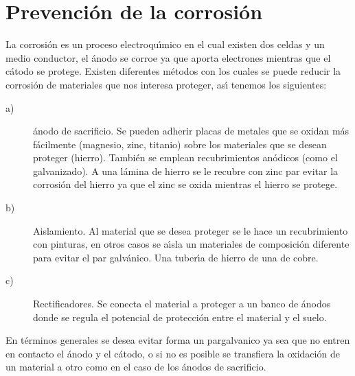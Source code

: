 \section{Prevenci\'on de la corrosi\'on}

La corrosi\'on  es un proceso
electroqu\'{\i}mico en el cual existen dos celdas y un medio conductor, el \'anodo se
corroe ya que aporta electrones mientras que el c\'atodo se protege.
Existen diferentes m\'etodos con los cuales se puede reducir la corrosi\'on de materiales
que nos interesa proteger, as\'{\i} tenemos los siguientes:

\begin{description}
\item[a)]\'anodo de sacrificio. Se pueden adherir placas de metales que se o\-xidan m\'as f\'acilmente (magnesio, zinc, titanio) sobre los materiales que se desean proteger (hierro). Tambi\'en se emplean recubrimientos an\'odicos  (como el galvanizado). A una l\'amina de hierro se le recubre con zinc par evitar la corrosi\'on del hierro ya que el zinc se oxida mientras el hierro se protege.
\item[b)]Aislamiento. Al material que se desea proteger se le hace un recubri\-miento con pinturas, en otros casos se a\'{\i}sla un materiales de composici\'on  diferente para evitar el par galv\'anico. Una tuber\'{\i}a de hierro de una de cobre.
\item[c)] Rectificadores. Se conecta el material a proteger a un banco de \'anodos donde se regula el potencial de protecci\'on entre el material y el suelo.
\end{description}
En t\'erminos generales se desea evitar forma un \gls{pargalvanico}  ya sea que no entren en contacto el \'anodo y el c\'atodo, o si no es posible se transfiera la oxidaci\'on de un material a otro como en el caso de los \'anodos de sacrificio.

